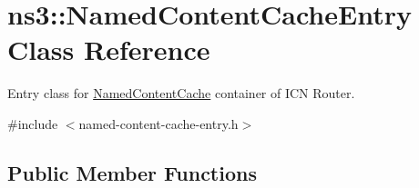 \hypertarget{classns3_1_1NamedContentCacheEntry}{\section{ns3\-:\-:Named\-Content\-Cache\-Entry Class Reference}
\label{classns3_1_1NamedContentCacheEntry}
}


Entry class for \hyperlink{classns3_1_1NamedContentCache}{Named\-Content\-Cache} container of I\-C\-N Router.  




{\ttfamily \#include $<$named-\/content-\/cache-\/entry.\-h$>$}

\subsection*{Public Member Functions}
